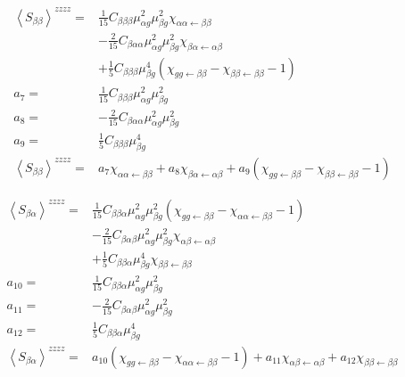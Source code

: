 \begin{align*}
	\left \langle S_{\beta \beta} \right \rangle^{zzzz} =&  \frac{1}{15}C_{\beta \beta \beta} \mu_{\alpha g}^2 \mu_{\beta g}^2   \chi_{ \alpha \alpha \leftarrow \beta \beta } \\
	&- \frac{2}{15}C_{ \beta \alpha \alpha} \mu_{\alpha g}^2 \mu_{\beta g}^2 \chi_{\beta  \alpha \leftarrow \alpha \beta } \\
	&+ \frac{1}{5}C_{\beta \beta \beta}  \mu_{\beta g}^4 \left(  \chi_{g g \leftarrow \beta \beta}  -  \chi_{ \beta \beta \leftarrow \beta \beta} -1 \right) \\
	a_7 =&  \frac{1}{15}C_{\beta \beta \beta} \mu_{\alpha g}^2 \mu_{\beta g}^2 \\
	a_8 =&  -\frac{2}{15}C_{ \beta \alpha \alpha} \mu_{\alpha g}^2 \mu_{\beta g}^2  \\
	a_9 =&  \frac{1}{5}C_{\beta \beta \beta}  \mu_{\beta g}^4 \\
	\left \langle S_{\beta \beta} \right \rangle^{zzzz} =&  a_7   \chi_{ \alpha \alpha \leftarrow \beta \beta } + a_8 \chi_{\beta  \alpha \leftarrow \alpha \beta } + a_9 \left(  \chi_{g g \leftarrow \beta \beta}  -  \chi_{ \beta \beta \leftarrow \beta \beta} -1 \right)
\end{align*}


\begin{align*}
	\left \langle S_{\beta \alpha} \right \rangle^{zzzz} =&  \frac{1}{15}C_{\beta \beta \alpha} \mu_{\alpha g}^2 \mu_{\beta g}^2  \left(  \chi_{g g \leftarrow \beta \beta}  -  \chi_{ \alpha \alpha \leftarrow \beta \beta} -1 \right) \\
	&- \frac{2}{15}C_{ \beta \alpha \beta} \mu_{\alpha g}^2 \mu_{\beta g}^2 \chi_{ \alpha  \beta\leftarrow \alpha \beta } \\
	&+ \frac{1}{5}C_{\beta \beta \alpha}  \mu_{\beta g}^4  \chi_{ \beta \beta \leftarrow \beta \beta } \\
	a_{10} =&  \frac{1}{15}C_{\beta \beta \alpha} \mu_{\alpha g}^2 \mu_{\beta g}^2 \\
	a_{11} =&  -\frac{2}{15}C_{ \beta \alpha \beta} \mu_{\alpha g}^2 \mu_{\beta g}^2  \\
	a_{12} =&  \frac{1}{5}C_{\beta \beta \alpha}  \mu_{\beta g}^4 \\
	\left \langle S_{\beta \alpha} \right \rangle^{zzzz} =&  a_{10} \left(  \chi_{g g \leftarrow \beta \beta}  -  \chi_{ \alpha \alpha \leftarrow \beta \beta} -1 \right) + a_{11} \chi_{ \alpha  \beta\leftarrow \alpha \beta } + a_{12}  \chi_{ \beta \beta \leftarrow \beta \beta }
\end{align*}

